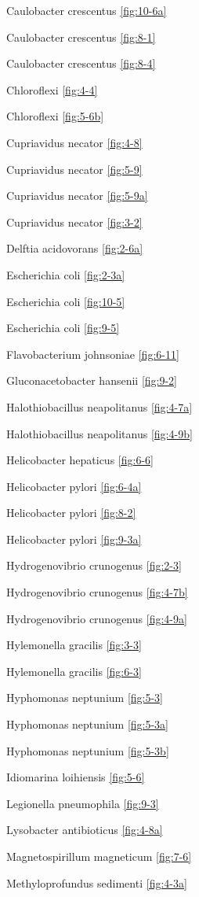 \documentclass[]{tufte-book}
\begin{document}
Caulobacter crescentus \ref{fig:10-6a}

Caulobacter crescentus \ref{fig:8-1}

Caulobacter crescentus \ref{fig:8-4}

Chloroflexi \ref{fig:4-4}

Chloroflexi \ref{fig:5-6b}

Cupriavidus necator \ref{fig:4-8}

Cupriavidus necator \ref{fig:5-9}

Cupriavidus necator \ref{fig:5-9a}

Cupriavidus necator \ref{fig:3-2}

Delftia acidovorans \ref{fig:2-6a}

Escherichia coli \ref{fig:2-3a}

Escherichia coli \ref{fig:10-5}

Escherichia coli \ref{fig:9-5}

Flavobacterium johnsoniae \ref{fig:6-11}

Gluconacetobacter hansenii \ref{fig:9-2}

Halothiobacillus neapolitanus \ref{fig:4-7a}

Halothiobacillus neapolitanus \ref{fig:4-9b}

Helicobacter hepaticus \ref{fig:6-6}

Helicobacter pylori \ref{fig:6-4a}

Helicobacter pylori \ref{fig:8-2}

Helicobacter pylori \ref{fig:9-3a}

Hydrogenovibrio crunogenus \ref{fig:2-3}

Hydrogenovibrio crunogenus \ref{fig:4-7b}

Hydrogenovibrio crunogenus \ref{fig:4-9a}

Hylemonella gracilis \ref{fig:3-3}

Hylemonella gracilis \ref{fig:6-3}

Hyphomonas neptunium \ref{fig:5-3}

Hyphomonas neptunium \ref{fig:5-3a}

Hyphomonas neptunium \ref{fig:5-3b}

Idiomarina loihiensis \ref{fig:5-6}

Legionella pneumophila \ref{fig:9-3}

Lysobacter antibioticus \ref{fig:4-8a}

Magnetospirillum magneticum \ref{fig:7-6}

Methyloprofundus sedimenti \ref{fig:4-3a}
\end{document}
